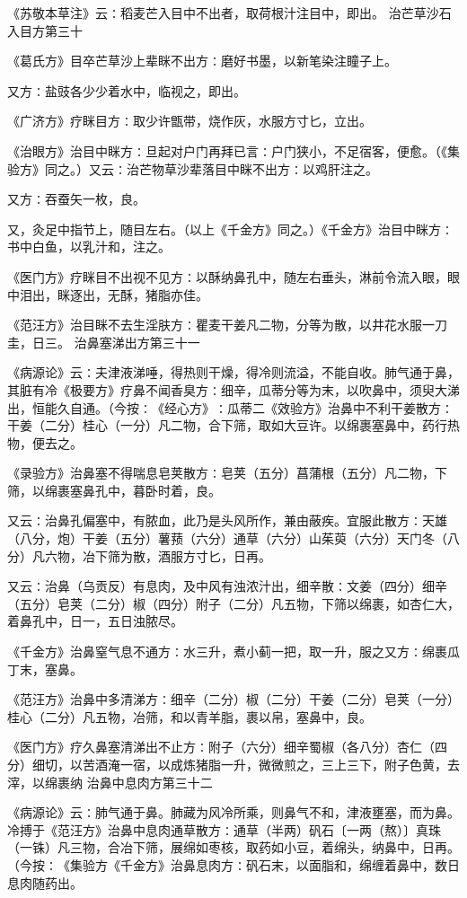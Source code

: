 \documentclass[a4paper,12pt,UTF8,twoside]{ctexbook}
\begin{document}
《苏敬本草注》云∶稻麦芒入目中不出者，取荷根汁注目中，即出。
治芒草沙石入目方第三十

《葛氏方》目卒芒草沙上辈眯不出方∶磨好书墨，以新笔染注瞳子上。

又方∶盐豉各少少着水中，临视之，即出。

《广济方》疗眯目方∶取少许甑带，烧作灰，水服方寸匕，立出。

《治眼方》治目中眯方∶旦起对户门再拜已言∶户门狭小，不足宿客，便愈。（《集验方》同之。）又云∶治芒物草沙辈落目中眯不出方∶以鸡肝注之。

又方∶吞蚕矢一枚，良。

又，灸足中指节上，随目左右。（以上《千金方》同之。）《千金方》治目中眯方∶书中白鱼，以乳汁和，注之。

《医门方》疗眯目不出视不见方∶以酥纳鼻孔中，随左右垂头，淋前令流入眼，眼中泪出，眯逐出，无酥，猪脂亦佳。

《范汪方》治目眯不去生淫肤方∶瞿麦干姜凡二物，分等为散，以井花水服一刀圭，日三。
治鼻塞涕出方第三十一

《病源论》云∶夫津液涕唾，得热则干燥，得冷则流溢，不能自收。肺气通于鼻，其脏有冷《极要方》疗鼻不闻香臭方∶细辛，瓜蒂分等为末，以吹鼻中，须臾大涕出，恒能久自通。（今按∶《经心方》∶瓜蒂二《效验方》治鼻中不利干姜散方∶干姜（二分）桂心（一分）凡二物，合下筛，取如大豆许。以绵裹塞鼻中，药行热物，便去之。

《录验方》治鼻塞不得喘息皂荚散方∶皂荚（五分）菖蒲根（五分）凡二物，下筛，以绵裹塞鼻孔中，暮卧时着，良。

又云∶治鼻孔偏塞中，有脓血，此乃是头风所作，兼由蔽疾。宜服此散方∶天雄（八分，炮）干姜（五分）薯蓣（六分）通草（六分）山茱萸（六分）天门冬（八分）凡六物，冶下筛为散，酒服方寸匕，日再。

又云∶治鼻（乌贡反）有息肉，及中风有浊浓汁出，细辛散∶文姜（四分）细辛（五分）皂荚（二分）椒（四分）附子（二分）凡五物，下筛以绵裹，如杏仁大，着鼻孔中，日一，五日浊脓尽。

《千金方》治鼻窒气息不通方∶水三升，煮小蓟一把，取一升，服之又方∶绵裹瓜丁末，塞鼻。

《范汪方》治鼻中多清涕方∶细辛（二分）椒（二分）干姜（二分）皂荚（一分）桂心（二分）凡五物，冶筛，和以青羊脂，裹以帛，塞鼻中，良。

《医门方》疗久鼻塞清涕出不止方∶附子（六分）细辛蜀椒（各八分）杏仁（四分）细切，以苦酒淹一宿，以成炼猪脂一升，微微煎之，三上三下，附子色黄，去滓，以绵裹纳
治鼻中息肉方第三十二

《病源论》云∶肺气通于鼻。肺藏为风冷所乘，则鼻气不和，津液壅塞，而为鼻。冷搏于《范汪方》治鼻中息肉通草散方∶通草（半两）矾石〔一两（熬）〕真珠（一铢）凡三物，合冶下筛，展绵如枣核，取药如小豆，着绵头，纳鼻中，日再。（今按∶《集验方《千金方》治鼻息肉方∶矾石末，以面脂和，绵缠着鼻中，数日息肉随药出。
\end{document}
